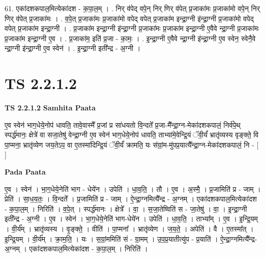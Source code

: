 \documentclass[17pt]{extarticle}
\begin{document}
61. एका॑दशकपाल॒मित्येका॑दश - क॒पा॒ल॒म् । . निर् व॑पेद् वपे॒न् निर् णिर् व॑पेत् प्र॒जाका॑मः प्र॒जाका॑मो वपे॒न् निर् णिर् व॑पेत् प्र॒जाका॑मः । . व॒पे॒त् प्र॒जाका॑मः प्र॒जाका॑मो वपेद् वपेत् प्र॒जाका॑म इन्द्रा॒ग्नी इ॑न्द्रा॒ग्नी प्र॒जाका॑मो वपेद् वपेत् प्र॒जाका॑म इन्द्रा॒ग्नी । . प्र॒जाका॑म इन्द्रा॒ग्नी इ॑न्द्रा॒ग्नी प्र॒जाका॑मः प्र॒जाका॑म इन्द्रा॒ग्नी ए॒वैवे न्द्रा॒ग्नी प्र॒जाका॑मः प्र॒जाका॑म इन्द्रा॒ग्नी ए॒व । . प्र॒जाका॑म॒ इति॑ प्र॒जा - का॒मः॒ । . इ॒न्द्रा॒ग्नी ए॒वैवे न्द्रा॒ग्नी इ॑न्द्रा॒ग्नी ए॒व स्वेन॒ स्वेनै॒वे न्द्रा॒ग्नी इ॑न्द्रा॒ग्नी ए॒व स्वेन॑ । . इ॒न्द्रा॒ग्नी इती᳚न्द्र - अ॒ग्नी । \newline
\pagebreak
{}

\section{ TS 2.2.1.2 }

\textbf{TS 2.2.1.2 } \newline
\textbf{Samhita Paata} \newline

ए॒व स्वेन॑ भाग॒धेये॒नोप॑ धावति॒ तावे॒वास्मै᳚ प्र॒जां प्र सा॑धयतो वि॒न्दते᳚ प्र॒जा-मै᳚न्द्रा॒ग्न-मेका॑दशकपालं॒ निर्व॑पे॒थ् स्पर्द्ध॑मानः॒ क्षेत्रे॑ वा सजा॒तेषु॑ वेन्द्रा॒ग्नी ए॒व स्वेन॑ भाग॒धेये॒नोप॑ धावति॒ ताभ्या॑मे॒वेन्द्रि॒यं ॅवी॒र्यं॑ भ्रातृ॑व्यस्य वृङ्क्ते॒ वि पा॒प्मना॒ भ्रातृ॑व्येण जय॒तेऽप॒ वा ए॒तस्मा॑दिन्द्रि॒यं ॅवी॒र्यं॑ क्रामति॒ यः स॑ग्रां॒म-मु॑पप्र॒यात्यै᳚न्द्रा॒ग्न-मेका॑दशकपालं॒ नि - [  ] \newline

\textbf{Pada Paata} \newline

ए॒व । स्वेन॑ । भा॒ग॒धेये॒नेति॑ भाग - धेये॑न । उपेति॑ । धा॒व॒ति॒ । तौ । ए॒व । अ॒स्मै॒ । प्र॒जामिति॑ प्र - जाम् । प्रेति॑ । सा॒ध॒य॒तः॒ । वि॒न्दते᳚ । प्र॒जामिति॑ प्र - जाम् । ऐ॒न्द्रा॒ग्नमित्यै᳚न्द्र - अ॒ग्नम् । एका॑दशकपाल॒मित्येका॑दश - क॒पा॒ल॒म् । निरिति॑ । व॒पे॒त् । स्पर्द्ध॑मानः । क्षेत्रे᳚ । वा॒ । स॒जा॒तेष्विति॑ स - जा॒तेषु॑ । वा॒ । इ॒न्द्रा॒ग्नी इती᳚न्द्र - अ॒ग्नी । ए॒व । स्वेन॑ । भा॒ग॒धेये॒नेति॑ भाग-धेये॑न । उपेति॑ । धा॒व॒ति॒ । ताभ्या᳚म् । ए॒व । इ॒न्द्रि॒यम् । वी॒र्य᳚म् । भ्रातृ॑व्यस्य । वृ॒ङ्क्ते॒ । वीति॑ । पा॒प्मना᳚ । भ्रातृ॑व्येण । ज॒य॒ते॒ । अपेति॑ । वै । ए॒तस्मा᳚त् । इ॒न्द्रि॒यम् । वी॒र्य᳚म् । क्रा॒म॒ति॒ । यः । स॒ग्रां॒ममिति॑ सं - ग्रा॒मम् । उ॒प॒प्र॒यातीत्यु॑प - प्र॒याति॑ । ऐ॒न्द्रा॒ग्नमित्यै᳚न्द्र-अ॒ग्नम् । एका॑दशकपाल॒मित्येका॑दश - क॒पा॒ल॒म् । निरिति॑ ।  \newline
\end{document}
